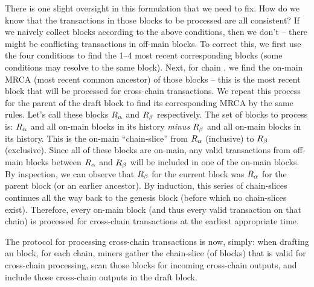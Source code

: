 There is one slight oversight in this formulation that we need to fix.
How do we know that the transactions in those blocks to be processed are all consistent?
If we naively collect blocks according to the above conditions, then we don't -- there might be conflicting transactions in off-main blocks.
To correct this, we first use the four conditions to find the 1--4 most recent corresponding blocks (some conditions may resolve to the same block).
Next, for chain \cR, we find the on-main MRCA (most recent common ancestor) of those blocks -- this is the most recent block that will be processed for cross-chain transactions.
We repeat this process for the parent of the draft block to find its corresponding MRCA by the same rules.
Let's call these blocks $R_\alpha$ and $R_\beta$ respectively.
The set of blocks to process is: $R_\alpha$ and all on-main blocks in its history \emph{minus} $R_\beta$ and all on-main blocks in its history.
This is the on-main ``chain-slice'' from $R_\alpha$ (inclusive) to $R_\beta$ (exclusive).
Since all of these blocks are on-main, any valid transactions from off-main blocks between $R_\alpha$ and $R_\beta$ will be included in one of the on-main blocks.
By inspection, we can observe that $R_\beta$ for the current block was $R_\alpha$ for the parent block (or an earlier ancestor).
By induction, this series of chain-slices continues all the way back to the genesis block (before which no chain-slices exist).
Therefore, every on-main block (and thus every valid transaction on that chain) is processed for cross-chain transactions at the earliest appropriate time.

The protocol for processing cross-chain transactions is now, simply: when drafting an \cL block, for each \cR chain, miners gather the chain-slice (of \cR blocks) that is valid for cross-chain processing, scan those blocks for incoming cross-chain outputs, and include those cross-chain outputs in the draft block.



